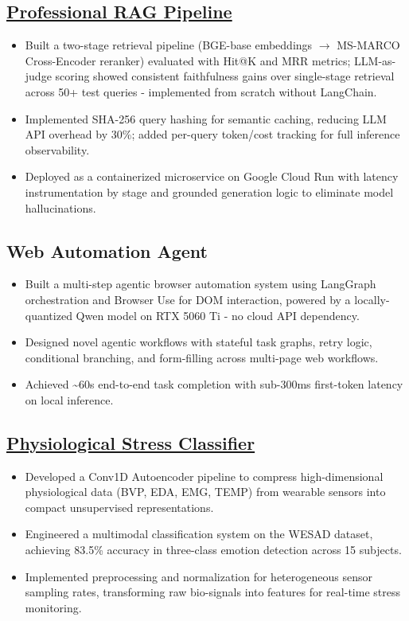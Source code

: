 \documentclass[letterpaper,10pt]{article}
\begin{document}
\subsection*{\href{https://github.com/Vikhyat-Chauhan/ProfessionalRAG}{Professional RAG Pipeline}}
\begin{itemize}
    \item Built a two-stage retrieval pipeline (BGE-base embeddings $\rightarrow$ MS-MARCO Cross-Encoder reranker) evaluated with Hit@K and MRR metrics; LLM-as-judge scoring showed consistent faithfulness gains over single-stage retrieval across 50+ test queries - implemented from scratch without LangChain.
    \item Implemented SHA-256 query hashing for semantic caching, reducing LLM API overhead by 30\%; added per-query token/cost tracking for full inference observability.
    \item Deployed as a containerized microservice on Google Cloud Run with latency instrumentation by stage and grounded generation logic to eliminate model hallucinations.
\end{itemize}

\subsection*{Web Automation Agent}
\begin{itemize}
    \item Built a multi-step agentic browser automation system using LangGraph orchestration and Browser Use for DOM interaction, powered by a locally-quantized Qwen model on RTX 5060 Ti - no cloud API dependency.
    \item Designed novel agentic workflows with stateful task graphs, retry logic, conditional branching, and form-filling across multi-page web workflows.
    \item Achieved \textasciitilde60s end-to-end task completion with sub-300ms first-token latency on local inference.
\end{itemize}

\subsection*{\href{https://github.com/Vikhyat-Chauhan/BioelectronicsAiWesad.git}{Physiological Stress Classifier}}
\begin{itemize}
     \item Developed a Conv1D Autoencoder pipeline to compress high-dimensional physiological data (BVP, EDA, EMG, TEMP) from wearable sensors into compact unsupervised representations.
    \item Engineered a multimodal classification system on the WESAD dataset, achieving 83.5\% accuracy in three-class emotion detection across 15 subjects.
    \item Implemented preprocessing and normalization for heterogeneous sensor sampling rates, transforming raw bio-signals into features for real-time stress monitoring.
\end{itemize}
\end{document}
